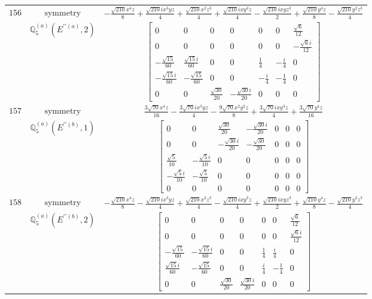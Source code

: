 \documentclass[fleqn,8pt,landscape]{jsarticle}
\begin{document}
\begin{longtable}{ccc}
$ 156 $ & $ \text{symmetry} $ & $ - \frac{\sqrt{210} x^{4} z}{8} + \frac{\sqrt{210} i x^{3} y z}{4} + \frac{\sqrt{210} x^{2} z^{3}}{4} + \frac{\sqrt{210} i x y^{3} z}{4} - \frac{\sqrt{210} i x y z^{3}}{2} + \frac{\sqrt{210} y^{4} z}{8} - \frac{\sqrt{210} y^{2} z^{3}}{4} $ \\
$  $ & $ \mathbb{Q}_{5}^{(a)}(E^{\prime\prime(a)},2) $ & $ \begin{bmatrix} 0 & 0 & 0 & 0 & 0 & 0 & \frac{\sqrt{6}}{12} \\ 0 & 0 & 0 & 0 & 0 & 0 & - \frac{\sqrt{6} i}{12} \\ - \frac{\sqrt{15}}{60} & \frac{\sqrt{15} i}{60} & 0 & 0 & \frac{1}{4} & - \frac{i}{4} & 0 \\ - \frac{\sqrt{15} i}{60} & - \frac{\sqrt{15}}{60} & 0 & 0 & - \frac{i}{4} & - \frac{1}{4} & 0 \\ 0 & 0 & \frac{\sqrt{30}}{20} & - \frac{\sqrt{30} i}{20} & 0 & 0 & 0 \end{bmatrix} $ \\ \hline
$ 157 $ & $ \text{symmetry} $ & $ \frac{3 \sqrt{70} x^{4} z}{16} - \frac{3 \sqrt{70} i x^{3} y z}{4} - \frac{9 \sqrt{70} x^{2} y^{2} z}{8} + \frac{3 \sqrt{70} i x y^{3} z}{4} + \frac{3 \sqrt{70} y^{4} z}{16} $ \\
$  $ & $ \mathbb{Q}_{5}^{(a)}(E^{\prime\prime(b)},1) $ & $ \begin{bmatrix} 0 & 0 & \frac{\sqrt{30}}{20} & - \frac{\sqrt{30} i}{20} & 0 & 0 & 0 \\ 0 & 0 & - \frac{\sqrt{30} i}{20} & - \frac{\sqrt{30}}{20} & 0 & 0 & 0 \\ \frac{\sqrt{5}}{10} & - \frac{\sqrt{5} i}{10} & 0 & 0 & 0 & 0 & 0 \\ - \frac{\sqrt{5} i}{10} & - \frac{\sqrt{5}}{10} & 0 & 0 & 0 & 0 & 0 \\ 0 & 0 & 0 & 0 & 0 & 0 & 0 \end{bmatrix} $ \\ \hline
$ 158 $ & $ \text{symmetry} $ & $ - \frac{\sqrt{210} x^{4} z}{8} - \frac{\sqrt{210} i x^{3} y z}{4} + \frac{\sqrt{210} x^{2} z^{3}}{4} - \frac{\sqrt{210} i x y^{3} z}{4} + \frac{\sqrt{210} i x y z^{3}}{2} + \frac{\sqrt{210} y^{4} z}{8} - \frac{\sqrt{210} y^{2} z^{3}}{4} $ \\
$  $ & $ \mathbb{Q}_{5}^{(a)}(E^{\prime\prime(b)},2) $ & $ \begin{bmatrix} 0 & 0 & 0 & 0 & 0 & 0 & \frac{\sqrt{6}}{12} \\ 0 & 0 & 0 & 0 & 0 & 0 & \frac{\sqrt{6} i}{12} \\ - \frac{\sqrt{15}}{60} & - \frac{\sqrt{15} i}{60} & 0 & 0 & \frac{1}{4} & \frac{i}{4} & 0 \\ \frac{\sqrt{15} i}{60} & - \frac{\sqrt{15}}{60} & 0 & 0 & \frac{i}{4} & - \frac{1}{4} & 0 \\ 0 & 0 & \frac{\sqrt{30}}{20} & \frac{\sqrt{30} i}{20} & 0 & 0 & 0 \end{bmatrix} $ \\ \hline

\end{longtable}
\end{document}
